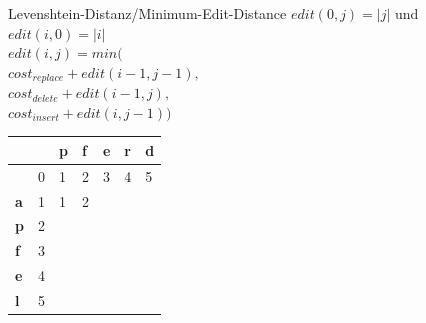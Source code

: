 \documentclass[aspectratio=169]{beamer}
\begin{document}
\begin{frame}[fragile]{Levenshtein-Distanz/Minimum-Edit-Distance}
$edit(0,j)=|j|$ und $edit(i,0)=|i|$\\
$edit(i,j)=min($\\
$cost_{replace} + edit(i-1,j-1),  $\\
$cost_{delete}+ edit(i-1,j),$\\
$cost_{insert}+ edit(i,j-1))  $\\
\begin{table}[]
\begin{tabular}{|l|l|l|l|l|l|l|}
\hline
           & \textbf{} & \textbf{p} & \textbf{f} & \textbf{e} & \textbf{r} & \textbf{d} \\ \hline
\textbf{}  & 0         & 1          & 2          & 3          & 4          & 5          \\ \hline
\textbf{a} & 1         & 1          & 2          &            &            &            \\ \hline
\textbf{p} & 2         &            &            &            &            &            \\ \hline
\textbf{f} & 3         &            &            &            &            &            \\ \hline
\textbf{e} & 4         &            &            &            &            &            \\ \hline
\textbf{l} & 5         &            &            &            &            &            \\ \hline
\end{tabular}
\end{table}
\end{frame}
\end{document}
